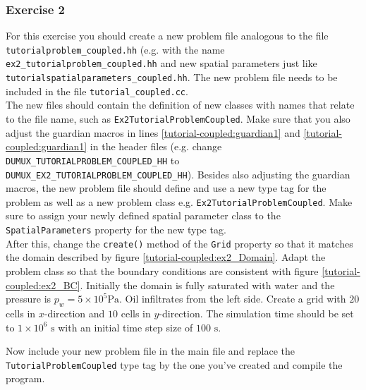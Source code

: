\subsubsection{Exercise 2}
For this exercise you should create a new problem file analogous to
the file \texttt{tutorialproblem\_coupled.hh} (e.g. with the name 
\texttt{ex2\_tutorialproblem\_coupled.hh} and new spatial parameters 
just like \texttt{tutorialspatialparameters\_coupled.hh}. The new problem file needs to
be included in the file \texttt{tutorial\_coupled.cc}.\\
The new files should contain the definition of new classes with 
names that relate to the file name, such as 
\texttt{Ex2TutorialProblemCoupled}. Make sure that you also adjust the guardian
macros in lines \ref{tutorial-coupled:guardian1} and \ref{tutorial-coupled:guardian1}
 in the header files (e.g. change \\
\texttt{DUMUX\_TUTORIALPROBLEM\_COUPLED\_HH} to
\texttt{DUMUX\_EX2\_TUTORIALPROBLEM\_COUPLED\_HH}). Besides also adjusting the guardian macros, 
the new problem file should define and use a new type tag for the problem as well as a new problem class
e.g. \texttt{Ex2TutorialProblemCoupled}. Make sure to assign your newly defined spatial 
parameter class to the \texttt{SpatialParameters} property for the new 
type tag. \\
After this, change the \texttt{create()} method of the \texttt{Grid}
property so that it matches the domain described
by figure \ref{tutorial-coupled:ex2_Domain}. Adapt the problem class
so that the boundary conditions are consistent with figure
\ref{tutorial-coupled:ex2_BC}. Initially the domain is fully saturated
with water and the pressure is $p_w = 5 \times 10^5 \text{Pa}$. Oil
infiltrates from the left side. Create a grid with $20$ cells in
$x$-direction and $10$ cells in $y$-direction. The simulation time
should be set to $1\times 10^6 \text{ s}$ with an initial time step size of
$100 \text{ s}$.

Now include your new problem file in the main file and replace the
\texttt{TutorialProblemCoupled} type tag by the one you've created and
compile the program.


